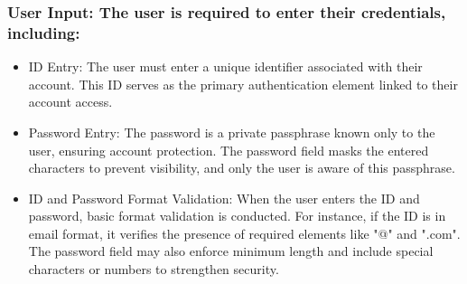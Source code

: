 \documentclass[conference]{IEEEtran}
\begin{document}
\subsubsection{User Input: The user is required to enter their credentials, including:}
\begin{itemize}
    \item ID Entry: The user must enter a unique identifier associated with their account. This ID serves as the primary authentication element linked to their account access.\\
    \item Password Entry: The password is a private passphrase known only to the user, ensuring account protection. The password field masks the entered characters to prevent visibility, and only the user is aware of this passphrase.\\
    \item ID and Password Format Validation: When the user enters the ID and password, basic format validation is conducted. For instance, if the ID is in email format, it verifies the presence of required elements like "@" and ".com". The password field may also enforce minimum length and include special characters or numbers to strengthen security.\\
\end{itemize}
\end{document}
